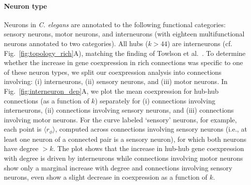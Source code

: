 \documentclass[10pt,letterpaper]{article}
\begin{document}
\paragraph{Neuron type}
Neurons in \emph{C. elegans} are annotated to the following functional categories: sensory neurons, motor neurons, and interneurons (with eighteen multifunctional neurons annotated to two categories).
All hubs ($k > 44$) are interneurons (cf. Fig.~\ref{fig:topology_rich}A), matching the finding of Towlson et al.~\cite{Towlson:2013gf}.
To determine whether the increase in gene coexpression in rich connections was specific to one of these neuron types, we split our coexpression analysis into connections involving: (i) interneurons, (ii) sensory neurons, and (iii) motor neurons.
In Fig.~\ref{fig:interneuron_dep}A, we plot the mean coexpression for hub-hub connections (as a function of $k$) separately for (i) connections involving interneurons, (ii) connections involving sensory neurons, and (iii) connections involving motor neurons.
For the curve labeled `sensory' neurons, for example, each point is $\langle r_\phi \rangle$, computed across connections involving sensory neurons (i.e., at least one neuron of a connected pair is a sensory neuron), for which both neurons have degree $>k$.
The plot shows that the increase in hub-hub gene coexpression with degree is driven by interneurons while connections involving motor neurons show only a marginal increase with degree and connections involving sensory neurons, even show a slight decrease in coexpression as a function of $k$.
\end{document}

